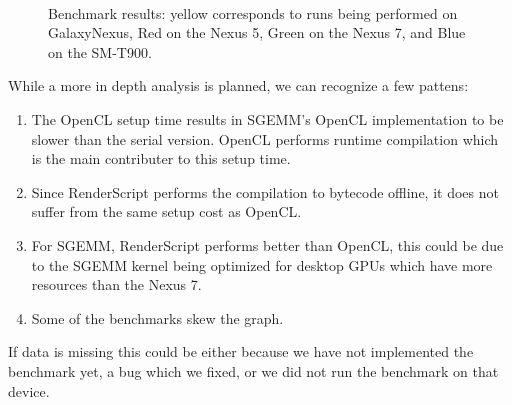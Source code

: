 \begin{figure}
    ~
    \\
    \caption{Benchmark results: yellow corresponds to runs being performed on GalaxyNexus, Red on the Nexus 5, Green on the Nexus 7, and Blue on the SM-T900.}%
    \label{fig:benchmarks}%
\end{figure}

While a more in depth analysis is planned, we can recognize a few pattens:

\begin{enumerate}
\item The OpenCL setup time results in SGEMM's OpenCL implementation to be slower than the serial version. OpenCL performs runtime compilation which is the main contributer to this setup time.
\item Since RenderScript performs the compilation to bytecode offline, it does not suffer from the same setup cost as OpenCL.
\item For SGEMM, RenderScript performs better than OpenCL, this could be due
  to the SGEMM kernel being optimized for desktop GPUs which have more resources than the Nexus 7.
\item Some of the benchmarks skew the graph.
\end{enumerate}

If data is missing this could be either because we have not implemented the benchmark yet, a bug which we fixed, or we did not run the benchmark on that
device.